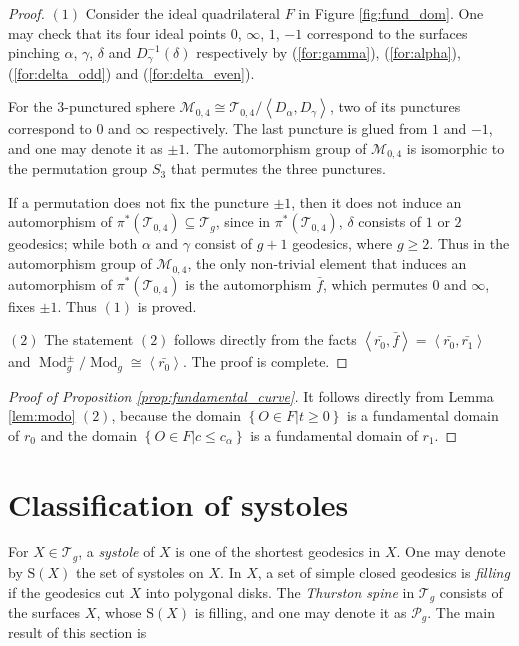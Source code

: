 \documentclass[UTF8]{amsart}
\numberwithin{equation}{section}
\theoremstyle{definition}
\theoremstyle{example}
\theoremstyle{remark}
\DeclareMathOperator{\modo}{Mod}
\begin{document}
\begin{proof}
 $(1)$ Consider the ideal quadrilateral $F$ in Figure \ref{fig:fund_dom}. 
 One may check that its 
  four ideal points $0$,  $\infty$, $1$, $-1$ correspond to the surfaces pinching $\alpha$, $\gamma$, $\delta$ and $D_{\gamma}^{-1}(\delta)$ respectively by (\ref{for:gamma}), (\ref{for:alpha}), (\ref{for:delta_odd}) and (\ref{for:delta_even}). 

 For the $3$-punctured sphere $\mathcal{M}_{0,4} \cong \mathcal{T}_{0,4}/ \left<D_{\alpha}, D_{\gamma} \right>$, two of its punctures correspond to $0$ and $\infty$ respectively. The last puncture is glued from $1$ and $-1$, and one may denote it as $\pm 1$. 
The automorphism group of $\mathcal{M}_{0,4}$ is isomorphic to the permutation group $S_3$ that permutes the three punctures.

If a permutation does not fix the puncture $\pm1$, 
then it does not induce an automorphism of $\pi^{*}(\mathcal{T}_{0,4}) \subseteq \mathcal{T}_g$, 
since in $\pi^{*}(\mathcal{T}_{0,4})$, $\delta$ consists of $1$ or $2$ geodesics; while both $\alpha$ and $\gamma$ consist of $g+1$ geodesics, where $g \ge 2$. 
Thus in the automorphism group of $\mathcal{M}_{0,4}$, the only non-trivial element that induces an automorphism of $\pi^{*}(\mathcal{T}_{0,4})$ is the automorphism $\bar{f}$, which permutes $0$ and $\infty$, fixes $\pm1$. Thus $(1)$ is proved. 

$(2)$ The statement $(2)$ follows directly from the facts $\left<\bar{r_0}, \bar{f} \right> = \left<\bar{r_0}, \bar{r_1} \right>$ and $\modo^{\pm}_g/\modo_g \cong \left<\bar{r_0} \right>$. The proof is complete. 

\end{proof}
\begin{proof}[Proof of Proposition \ref{prop:fundamental_curve}]
 It follows directly from Lemma \ref{lem:modo} $(2)$, because the domain $\left\{ O\in F | t \ge 0 \right\} $ is a fundamental domain of $r_0$ and the domain $\left\{ O\in F | c \le c_{\alpha} \right\} $ is a fundamental domain of $r_1$. 
\end{proof}

\section{Classification of systoles}
\label{sec:sys_cand}

For $X\in \mathcal{T}_g$, a \emph{systole} of $X$ is one of the shortest geodesics in $X$. One may denote by $\mathrm{S}(X)$ the set of systoles on  $X$. In $X$, a set of simple closed geodesics is \emph{filling} if the geodesics cut $X$ into polygonal disks. The \emph{Thurston spine} in $\mathcal{T}_g$ consists of the surfaces $X$, whose $\mathrm{S}(X)$ is filling, and one may denote it as $\mathcal{P}_g$. 
The main result of this section is 
\end{document}
